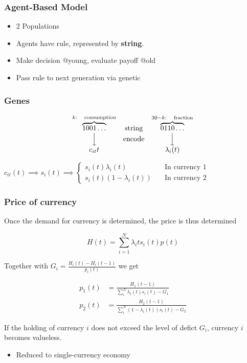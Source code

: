 \begin{frame}
    \frametitle{Agent-Based Model}

    \begin{itemize}
        \item 2 Populations
        \item Agents have rule, represented by \textbf{string}.
        \item Make decision @young, evaluate payoff @old
        \item Pass rule to next generation via genetic 
    \end{itemize}


\end{frame}

\begin{frame}
    \frametitle{Genes}

    \begin{equation*}
        \begin{array}{ccc}
            \overbrace{1001 \dots}^{k:\quad\text{consumption}} &\text{string}& \overbrace{0110 \dots}^{30-k:\quad\text{fraction}} \\
            \Big\downarrow &\text{encode}& \Big\downarrow \\
            c_{it}{t} & & \lambda_{i}(t)
        \end{array}
    \end{equation*}

    $c_{it}(t) \implies s_i(t) \implies \begin{cases}
        s_i(t) \lambda_{i}(t) \quad &\text{In currency 1} \\
        s_i(t) (1-\lambda_{i}(t)) \quad &\text{In currency 2} 
    \end{cases}$

\end{frame}

\begin{frame}[allowframebreaks]
    \frametitle{Price of currency}
    Once the demand for currency is determined, the price is thus determined 

    \begin{equation*}
        H(t) = \sum_{i=1}^{N} \lambda_i{t} s_i(t) p(t)
    \end{equation*}

    Together with $G_i = \frac{H_i(t) - H_i(t-1)}{p_i(t)}$ we get 

    \begin{align*}
        p_1(t) &= \frac{H_1(t-1)}{\sum_i^N \lambda_i(t)s_i(t) - G_1} \\
        p_2(t) &= \frac{H_2(t-1)}{\sum_i^N (1-\lambda_i(t))s_i(t) - G_2}
    \end{align*}
    
    \framebreak

    If the holding of currency $i$ does not exceed the level of defict $G_i$, 
    currency $i$ becomes valueless. 
    \begin{itemize}
        \item Reduced to single-currency economy
    \end{itemize}

\end{frame}

